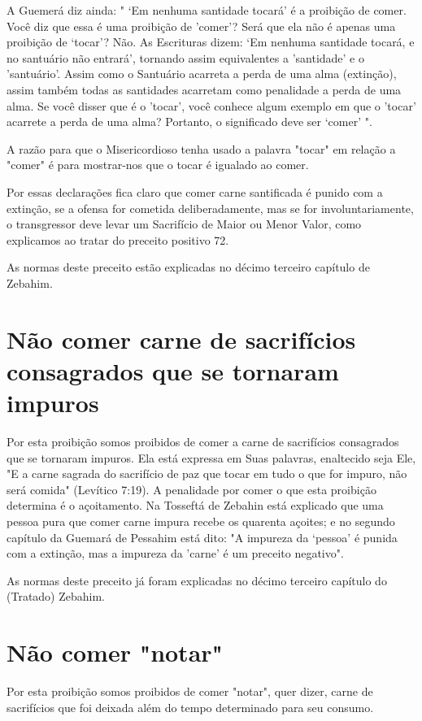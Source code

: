 \begin{itemize}
\begin{enumrate}
\begin{itemize}
\begin{itemize}
\begin{itemize}
A Guemerá diz ainda: " `Em nenhuma santidade tocará' é a proibi­ção de
comer. Você diz que essa é uma proibição de 'comer'? Será que ela não é
apenas uma proibição de `tocar'? Não. As Escrituras dizem: `Em nenhuma
san­tidade tocará, e no santuário não entrará', tornando assim
equivalentes a 'santi­dade' e o 'santuário'. Assim como o Santuário
acarreta a perda de uma alma (extinção), assim também todas as
santidades acarretam como penalidade a perda de uma alma. Se você disser
que é o 'tocar', você conhece algum exemplo em que o 'tocar' acarrete a
perda de uma alma? Portanto, o significado deve ser `comer' ".

A razão para que o Misericordioso tenha usado a palavra "tocar" em
relação a "comer" é para mostrar-nos que o tocar é igualado ao comer.

Por essas declarações fica claro que comer carne santificada é puni­do
com a extinção, se a ofensa for cometida deliberadamente, mas se for
invo­luntariamente, o transgressor deve levar um Sacrifício de Maior ou
Menor Va­lor, como explicamos ao tratar do preceito positivo 72.

As normas deste preceito estão explicadas no décimo terceiro capí­tulo
de Zebahim.

\section{Não comer carne de sacrifícios consagrados que se tornaram impuros}

Por esta proibição somos proibidos de comer a carne de sacrifícios
consagrados que se tornaram impuros. Ela está expressa em Suas palavras,
enal­tecido seja Ele, "E a carne sagrada do sacrifício de paz que tocar
em tudo o que for impuro, não será comida" (Levítico 7:19). A penalidade
por comer o que esta proibição determina é o açoitamento. Na Tosseftá de
Zebahin está ex­plicado que uma pessoa pura que comer carne impura
recebe os quarenta açoites; 
e no segundo capítulo da Guemará de Pessahim está dito: "A impureza
da `pessoa' é punida com a extinção, mas a impureza da 'carne' é um
preceito negativo".

As normas deste preceito já foram explicadas no décimo terceiro
ca­pítulo do (Tratado) Zebahim.

\section{Não comer "notar"}

Por esta proibição somos proibidos de comer "notar", quer dizer, carne
de sacrifícios que foi deixada além do tempo determinado para seu
consumo.


\end{itemize}
\end{itemize}
\end{itemize}
\end{enumrate}
\end{itemize}

